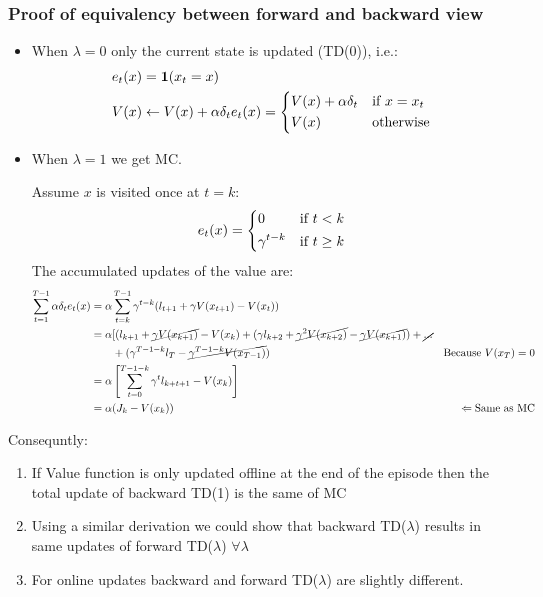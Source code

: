 \subsubsection{Proof of equivalency between forward and backward view}
\begin{itemize}
\item When $\lambda = 0$ only the current state is updated (TD(0)), i.e.:
\begin{align*}
e_t(x) &= \mathbf{1}(x_t=x)\\
V(x) &\leftarrow V(x) + \alpha\delta_t e_t(x) = 
\begin{dcases}
V(x) + \alpha\delta_t &\text{if }x=x_t\\
V(x) &\text{otherwise}
\end{dcases}
\end{align*}
\item When $\lambda = 1$ we get MC. 

Assume $x$ is visited once at $t = k$:
\[e_t(x) = 
\begin{dcases}
0&\text{if }t<k\\
\gamma^{t-k}&\text{if }t\ge k
\end{dcases}\]
The accumulated updates of the value are:
\begin{align*}
\sum_{t=1}^{T-1} \alpha\delta_t e_t(x) &= \alpha \sum_{t=k}^{T-1} \gamma^{t-k} (l_{t+1} + \gamma V(x_{t+1}) - V(x_t))&\\
&= \alpha [( l_{k+1} + \cancel{\gamma V(x_{k+1})} - V(x_k) + (\gamma l_{k+2} + \cancel{\gamma^2 V(x_{k+2})} - \cancel{\gamma V(x_{k+1})}) + \cancel{...} \\
&\qquad+ (\gamma^{T-1-k}l_T-\cancel{\gamma^{T-1-k}V(x_{T-1})})& \text{Because }V(x_T) = 0\\
&= \alpha \left[ \sum_{t=0}^{T-1-k} \gamma^t l_{k+t+1} - V(x_k)\right]&\\
&=\alpha(J_k - V(x_k))&\Leftarrow \text{Same as MC}
\end{align*}
\end{itemize}
Consequntly:
\begin{enumerate}
\item If Value function is only updated offline at the end of the episode then the total update of backward TD(1) is the same of MC
\item Using a similar derivation we could show that backward TD($\lambda$) results in same updates of forward TD($\lambda$) $\forall \lambda$
\item For online updates backward and forward TD($\lambda$) are slightly different.
\end{enumerate}
























